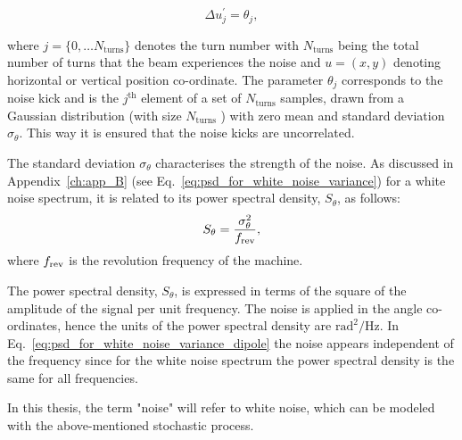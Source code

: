 \begin{equation}\label{eq:external_noise_kicks}
    \Delta u^\prime_{j} = \theta_j,
\end{equation}

where $j=\{ 0,\dots N_\mathrm{turns} \}$ denotes the turn number with $N_\mathrm{turns}$ being the total number of turns that the beam experiences the noise and $u=(x,y)$ denoting horizontal or vertical position co-ordinate. The parameter $\theta_j$ corresponds to the noise kick and is the $j^\mathrm{th}$ element of a set of $N_\mathrm{turns}$ samples, drawn from a Gaussian distribution (with size $N_\mathrm{turns}$ ) with zero mean and standard deviation $\sigma_\theta$. This way it is ensured that the noise kicks are uncorrelated.

The standard deviation $\sigma_\theta$ characterises the strength of the noise. As discussed in Appendix~\ref{ch:app_B} (see Eq.~\eqref{eq:psd_for_white_noise_variance}) for a white noise spectrum, it is related to its power spectral density, $S_\theta$, as follows:
\begin{equation}\label{eq:psd_for_white_noise_variance_dipole}
    S_\theta = \frac{\sigma_\theta^2 } {{f_\mathrm{rev}}},
 \end{equation}
where ${f_\mathrm{rev}}$ is the revolution frequency of the machine.

The power spectral density, $S_\theta$, is expressed in terms of the square of the amplitude of the signal per unit frequency. The noise is applied in the angle co-ordinates, hence the units of the power spectral density are $\mathrm{rad^2/Hz}$. In Eq.~\eqref{eq:psd_for_white_noise_variance_dipole} the noise appears independent of the frequency since for the white noise spectrum the power spectral density is the same for all frequencies.


In this thesis, the term "noise" will refer to white noise, which can be modeled with the above-mentioned stochastic process.



